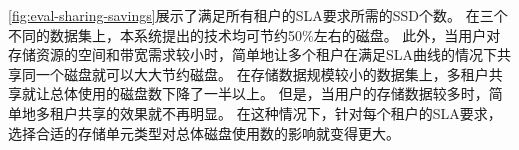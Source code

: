 \autoref{fig:eval-sharing-savings}展示了满足所有租户的SLA要求所需的SSD个数。
在三个不同的数据集上，本系统提出的技术均可节约50\%左右的磁盘。
此外，当用户对存储资源的空间和带宽需求较小时，简单地让多个租户在满足SLA曲线的情况下共享同一个磁盘就可以大大节约磁盘。
在存储数据规模较小的数据集上，多租户共享就让总体使用的磁盘数下降了一半以上。
但是，当用户的存储数据较多时，简单地多租户共享的效果就不再明显。
在这种情况下，针对每个租户的SLA要求，选择合适的存储单元类型对总体磁盘使用数的影响就变得更大。


